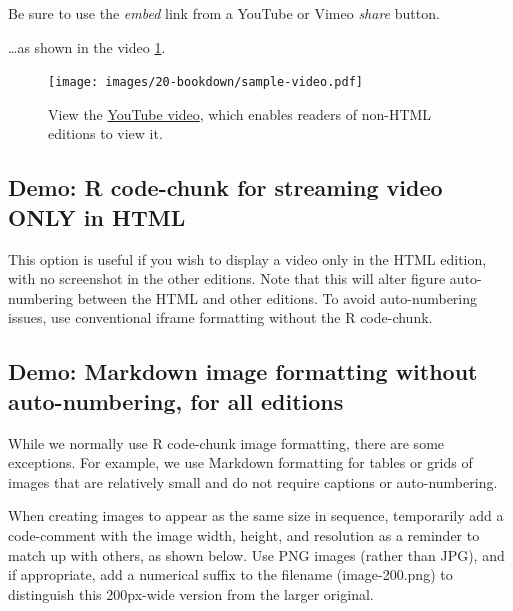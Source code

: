\documentclass[
  english,
]{book}
\begin{document}
Be sure to use the \emph{embed} link from a YouTube or Vimeo \emph{share} button.

\ldots as shown in the video \ref{fig:sample-video}.



\begin{figure}
\centering
\texttt{[image: images/20-bookdown/sample-video.pdf]}
\caption{\label{fig:sample-video}View the \href{https://youtu.be/M3_TWyva5yc}{YouTube video}, which enables readers of non-HTML editions to view it.}
\end{figure}

\hypertarget{demo-r-code-chunk-for-streaming-video-only-in-html}{%
\subsection*{Demo: R code-chunk for streaming video ONLY in HTML}\label{demo-r-code-chunk-for-streaming-video-only-in-html}}

This option is useful if you wish to display a video only in the HTML edition, with no screenshot in the other editions. Note that this will alter figure auto-numbering between the HTML and other editions. To avoid auto-numbering issues, use conventional iframe formatting without the R code-chunk.



\hypertarget{demo-markdown-image-formatting-without-auto-numbering-for-all-editions}{%
\subsection*{Demo: Markdown image formatting without auto-numbering, for all editions}\label{demo-markdown-image-formatting-without-auto-numbering-for-all-editions}}

While we normally use R code-chunk image formatting, there are some exceptions. For example, we use Markdown formatting for tables or grids of images that are relatively small and do not require captions or auto-numbering.

When creating images to appear as the same size in sequence, temporarily add a code-comment with the image width, height, and resolution as a reminder to match up with others, as shown below. Use PNG images (rather than JPG), and if appropriate, add a numerical suffix to the filename (image-200.png) to distinguish this 200px-wide version from the larger original.
\end{document}
